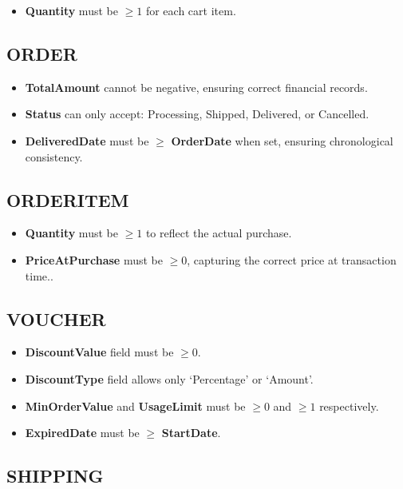 \begin{itemize}
    \item \textbf{Quantity} must be $\geq 1$ for each cart item.
\end{itemize}

\subsection{ORDER}

\begin{itemize}
    \item \textbf{TotalAmount} cannot be negative, ensuring correct financial records.
    \item \textbf{Status} can only accept: Processing, Shipped, Delivered, or Cancelled.
    \item \textbf{DeliveredDate} must be $\geq$ \textbf{OrderDate} when set, ensuring chronological consistency.
\end{itemize}

\subsection{ORDERITEM}

\begin{itemize}
    \item \textbf{Quantity} must be $\geq 1$ to reflect the actual purchase.
    \item \textbf{PriceAtPurchase} must be $\geq 0$, capturing the correct price at transaction time..
\end{itemize}

\subsection{VOUCHER}

\begin{itemize}
    \item \textbf{DiscountValue} field must be $\geq 0$.
    \item \textbf{DiscountType} field allows only `Percentage' or `Amount'.
    \item \textbf{MinOrderValue} and \textbf{UsageLimit} must be $\geq 0$ and $\geq 1$ respectively.
    \item \textbf{ExpiredDate} must be $\geq$ \textbf{StartDate}.
\end{itemize}

\subsection{SHIPPING}

